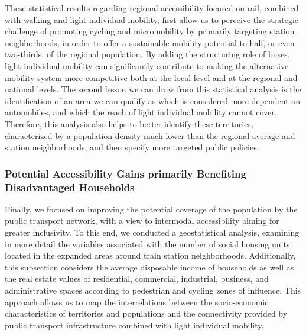 \begin{refsegment}
These statistical results regarding regional accessibility focused on rail, combined with walking and light individual mobility, first allow us to perceive the strategic challenge of promoting cycling and micromobility by primarily targeting station neighborhoods, in order to offer a sustainable mobility potential to half, or even two-thirds, of the regional population. By adding the structuring role of buses, light individual mobility can significantly contribute to making the alternative mobility system more competitive both at the local level and at the regional and national levels. The second lesson we can draw from this statistical analysis is the identification of an area we can qualify as  which is considered more dependent on automobiles, and which the reach of light individual mobility cannot cover. Therefore, this analysis also helps to better identify these territories, characterized by a population density much lower than the regional average and station neighborhoods, and then specify more targeted public policies.%

\subsubsection*{Potential Accessibility Gains primarily Benefiting Disadvantaged Households
    \label{chap5:accessibilite-inclusive}
}

Finally, we focused on improving the potential coverage of the population by the public transport network, with a view to intermodal accessibility aiming for greater inclusivity. To this end, we conducted a geostatistical analysis, examining in more detail the variables associated with the number of social housing units located in the expanded areas around train station neighborhoods. Additionally, this subsection considers the average disposable income of households as well as the real estate values of residential, commercial, industrial, business, and administrative spaces according to pedestrian and cycling zones of influence. This approach allows us to map the interrelations between the socio-economic characteristics of territories and populations and the connectivity provided by public transport infrastructure combined with light individual mobility.%


\end{refsegment}
